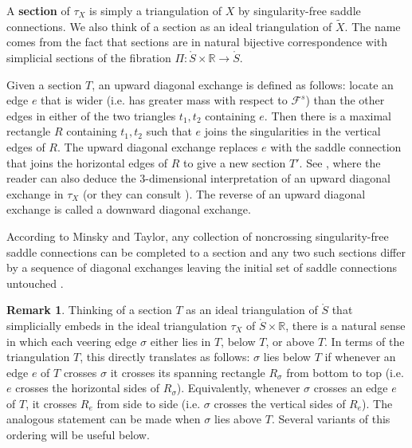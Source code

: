\documentclass[11pt,letterpaper]{amsart}
\newcommand{\RR}[0]{\mathbb{R}}
\newcommand{\wt}{\widetilde}
\newcommand{\mc}{\mathcal}
\newcommand{\mr}{\mathring}
\newcommand{\Scirc}{{\mathring{S}}}
\numberwithin{equation}{section}
\theoremstyle{definition}
\newtheorem{remark}[theorem]{Remark}
\newcommand{\define}[1]{\textbf{#1}}
\newcommand{\from}{\colon} %
\begin{document}
A \define{section} of $\tau_X$ is simply a triangulation of $X$ by singularity-free saddle connections. We also think of a section as an ideal triangulation of $\wt X$.
The name comes from the fact that sections are in natural bijective correspondence with simplicial sections of the fibration $\Pi \from \Scirc \times \RR \to \Scirc$. 

Given a section $T$, an upward diagonal exchange is defined as follows: locate an edge $e$ that is wider (i.e. has greater mass with respect to $\mc F^s$) than the other edges in either of the two triangles $t_1,t_2$ containing $e$. Then there is a maximal rectangle $R$ containing $t_1,t_2$ such that $e$ joins the singularities in the vertical edges of $R$. The upward diagonal exchange replaces $e$ with the saddle connection that joins the horizontal edges of $R$ to give a new section $T'$. See 
, where the reader can also deduce the $3$-dimensional interpretation of an upward diagonal exchange in $\tau_X$ (or they can consult   \cite[Section 3]{MinskyTaylor:FiberedFaces}). The reverse of an upward diagonal exchange is called a downward diagonal exchange.

According to Minsky and Taylor, any collection of noncrossing singularity-free saddle connections can be completed to a section \cite[Lemma 3.2]{MinskyTaylor:FiberedFaces} and any two such sections differ by a sequence of diagonal exchanges leaving the initial set of saddle connections untouched \cite[Proposition 3.3]{MinskyTaylor:FiberedFaces}. 

\begin{remark}\label{Rem:AboveBelow}
Thinking of a section $T$ as an ideal triangulation of $\mr S$ that simplicially embeds in the ideal triangulation $\tau_X$ of $\mr S \times \RR$, there is a natural sense in which each veering edge $\sigma$ either lies in $T$, below $T$, or above $T$. In terms of the triangulation $T$, this directly translates as follows: $\sigma$ lies below $T$ if whenever an edge $e$ of $T$ crosses $\sigma$ it crosses its spanning rectangle $R_\sigma$ from bottom to top (i.e. $e$ crosses the horizontal sides of $R_\sigma$). Equivalently, whenever $\sigma$ crosses an edge $e$ of $T$, it crosses $R_e$ from side to side (i.e. $\sigma$ crosses the vertical sides of $R_e$). The analogous statement can be made when $\sigma$ lies above $T$. Several variants of this ordering will be useful below.
\end{remark}
\end{document}
